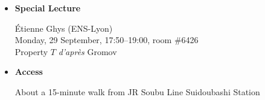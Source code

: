 \documentclass[a4paper]{article}
\newcommand{\bul}{$\bullet$}
\begin{document}
\begin{itemize}
{\bf Schweitzer S.J., Paul A.\ (PUC-Rio):}\vspace{1mm}

\hspace{5mm}I.\ Introduction to Gel'fand-Fuks cohomology\\
\hspace{5mm}II.\ The injectivity conjecture
\vspace{2mm}

{\bf Sergiescu, Vlad (Universit\'{e} de Grenoble):}\vspace{1mm}

\hspace{5mm}I.\ P.\ Greenberg's work on PL foliations\\
\hspace{5mm}II.\ Informal seminar
\vspace{2mm}

{\bf Tsuboi, Takashi (University of Tokyo):}\vspace{1mm}

\hspace{5mm}I.\ Introduction to the Mather-Thurston theory\\
\hspace{5mm}II.\ Connectivity in low differentiability
\vspace{2mm}

{\bf Vogt, Elmar (Freie Universit\"{a}t Berlin):}\vspace{1mm}

\hspace{5mm}I.\ Segal's and Moerdijk's construction of $B\Gamma$\\
\hspace{5mm}II.\ Differentiable cohomology for $B\Gamma$\\
\hspace{5mm}III.\ Real homotopy theory
\vspace{3mm}

\item[\bul] {\bf Special Lecture}

\'Etienne Ghys (ENS-Lyon)\\
Monday, 29 September, 17:50--19:00, room \#6426\\
\hspace{5mm}Property $T$ \textit{d'apr\`{e}s} Gromov

\item[\bul] \hypertarget{Access}{{\bf Access}}

About a 15-minute walk from JR Soubu Line Suidoubashi Station


\end{itemize}
\end{document}
